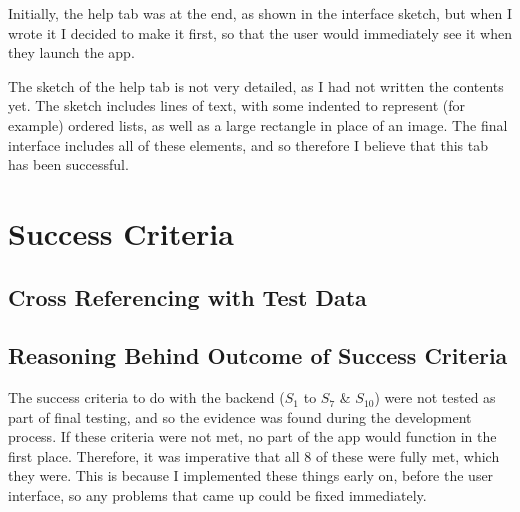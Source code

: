 \documentclass[12pt]{report}
\begin{document}
Initially, the help tab was at the end, as shown in the interface sketch, but when I wrote it I decided to make it first, so that the user would immediately see it when they launch the app.

The sketch of the help tab is not very detailed, as I had not written the contents yet. The sketch includes lines of text, with some indented to represent (for example) ordered lists, as well as a large rectangle in place of an image. The final interface includes all of these elements, and so therefore I believe that this tab has been successful.

\section{Success Criteria}
\subsection{Cross Referencing with Test Data}

\begin{center}
\end{center}

\subsection{Reasoning Behind Outcome of Success Criteria}
The success criteria to do with the backend ($S_{1}$ to $S_{7}$ \& $S_{10}$) were not tested as part of final testing, and so the evidence was found during the development process. If these criteria were not met, no part of the app would function in the first place. Therefore, it was imperative that all 8 of these were fully met, which they were. This is because I implemented these things early on, before the user interface, so any problems that came up could be fixed immediately.
\end{document}
